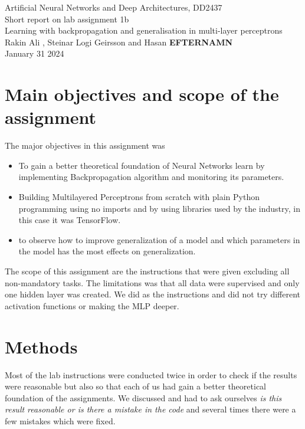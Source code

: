 \documentclass[a4paper]{article}
\begin{document}
\begin{center}
  {\large Artificial Neural Networks and Deep Architectures, DD2437}\\
  \vspace{7mm}
  {\huge Short report on lab assignment 1b\\[1ex]}
  {\Large Learning with backpropagation and generalisation in multi-layer perceptrons\\}
  \vspace{8mm}  
  {\Large Rakin Ali , Steinar Logi Geirsson and Hasan \textbf{EFTERNAMN}\\}
  \vspace{4mm}
  {\large January 31 2024 }
\end{center}

\section{Main objectives and scope of the assignment}
The major objectives in this assignment was
\begin{itemize}
\item To gain a better theoretical foundation of Neural Networks learn by implementing Backpropagation algorithm and monitoring its parameters. 
\item Building Multilayered Perceptrons from scratch with plain Python programming using no imports and by using libraries used by the industry, in this case it was TensorFlow.
\item to observe how to improve generalization of a model and which parameters in the model has the most effects on generalization. 
\end{itemize}
The scope of this assignment are the instructions that were given excluding all non-mandatory tasks. The limitations was that all data were supervised and only one hidden layer was created. We did as the instructions and did not try different activation functions or making the MLP deeper. 
\section{Methods}
Most of the lab instructions were conducted twice in order to check if the results were reasonable but also so that each of us had gain a better theoretical foundation of the assignments. We discussed and had to ask ourselves \textit{is this result reasonable or is there a mistake in the code} and several times there were a few mistakes which were fixed. 
\end{document}
